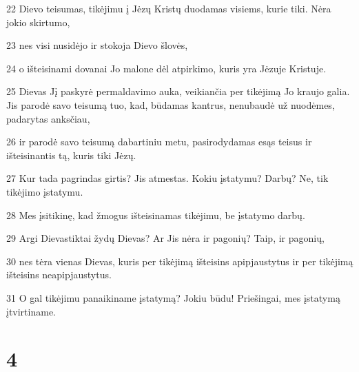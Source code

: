 \par 22 Dievo teisumas, tikėjimu į Jėzų Kristų duodamas visiems, kurie tiki. Nėra jokio skirtumo, 
\par 23 nes visi nusidėjo ir stokoja Dievo šlovės, 
\par 24 o išteisinami dovanai Jo malone dėl atpirkimo, kuris yra Jėzuje Kristuje. 
\par 25 Dievas Jį paskyrė permaldavimo auka, veikiančia per tikėjimą Jo kraujo galia. Jis parodė savo teisumą tuo, kad, būdamas kantrus, nenubaudė už nuodėmes, padarytas anksčiau, 
\par 26 ir parodė savo teisumą dabartiniu metu, pasirodydamas esąs teisus ir išteisinantis tą, kuris tiki Jėzų. 
\par 27 Kur tada pagrindas girtis? Jis atmestas. Kokiu įstatymu? Darbų? Ne, tik tikėjimo įstatymu. 
\par 28 Mes įsitikinę, kad žmogus išteisinamas tikėjimu, be įstatymo darbų. 
\par 29 Argi Dievas­tiktai žydų Dievas? Ar Jis nėra ir pagonių? Taip, ir pagonių, 
\par 30 nes tėra vienas Dievas, kuris per tikėjimą išteisins apipjaustytus ir per tikėjimą išteisins neapipjaustytus. 
\par 31 O gal tikėjimu panaikiname įstatymą? Jokiu būdu! Priešingai, mes įstatymą įtvirtiname.


\chapter{4}


